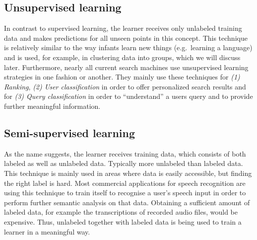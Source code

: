 \documentclass[conference]{IEEEtran}
\begin{document}
\subsection{Unsupervised learning}
In contrast to supervised learning, the learner receives only 
unlabeled training data and makes predictions for all unseen points in this concept. This technique is 
relatively similar to the way infants learn new things (e.g.\ learning a language) and 
is used, for example, in clustering data into groups, which we will discuss later\cite{BrainInf:holzinger}.
Furthermore, nearly all current search machines use unsupervised learning strategies in one fashion or another. 
They mainly use these techniques for \textit{(1) Ranking}, \textit{(2) User classification}\cite{DisciplineOfML:mitchell} 
in order to offer personalized search results and for \textit{(3) Query classification} in order to ``understand'' a 
users query and to provide further meaningful information. 

\subsection{Semi-supervised learning}
As the name suggests, the learner receives training data, which consists of both 
labeled as well as unlabeled data. Typically more unlabeled than labeled data.
This technique is mainly used in areas where data is easily accessible, 
but finding the right label is hard.
Most commercial applications for speech recognition are using this technique to train itself to 
recognise a user's speech input in order to perform further semantic analysis on
that data. Obtaining a sufficient amount of labeled data, for example the transcriptions of 
recorded audio files, would be expensive. Thus, unlabeled together with labeled data is being used 
to train a learner in a meaningful way.
\end{document}
